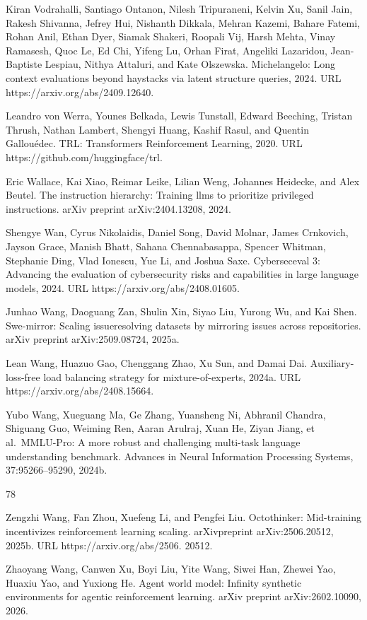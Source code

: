 \documentclass[
  10
]{article}
\begin{document}
Kiran Vodrahalli, Santiago Ontanon, Nilesh Tripuraneni, Kelvin Xu, Sanil
Jain, Rakesh Shivanna, Jefrey Hui, Nishanth Dikkala, Mehran Kazemi,
Bahare Fatemi, Rohan Anil, Ethan Dyer, Siamak Shakeri, Roopali Vij,
Harsh Mehta, Vinay Ramasesh, Quoc Le, Ed Chi, Yifeng Lu, Orhan Firat,
Angeliki Lazaridou, Jean-Baptiste Lespiau, Nithya Attaluri, and Kate
Olszewska. Michelangelo: Long context evaluations beyond haystacks via
latent structure queries, 2024. URL https://arxiv.org/abs/2409.12640.

Leandro von Werra, Younes Belkada, Lewis Tunstall, Edward Beeching,
Tristan Thrush, Nathan Lambert, Shengyi Huang, Kashif Rasul, and Quentin
Gallouédec. TRL: Transformers Reinforcement Learning, 2020. URL
https://github.com/huggingface/trl.

Eric Wallace, Kai Xiao, Reimar Leike, Lilian Weng, Johannes Heidecke,
and Alex Beutel. The instruction hierarchy: Training llms to prioritize
privileged instructions. arXiv preprint arXiv:2404.13208, 2024.

Shengye Wan, Cyrus Nikolaidis, Daniel Song, David Molnar, James
Crnkovich, Jayson Grace, Manish Bhatt, Sahana Chennabasappa, Spencer
Whitman, Stephanie Ding, Vlad Ionescu, Yue Li, and Joshua Saxe.
Cyberseceval 3: Advancing the evaluation of cybersecurity risks and
capabilities in large language models, 2024. URL
https://arxiv.org/abs/2408.01605.

Junhao Wang, Daoguang Zan, Shulin Xin, Siyao Liu, Yurong Wu, and Kai
Shen. Swe-mirror: Scaling issueresolving datasets by mirroring issues
across repositories. arXiv preprint arXiv:2509.08724, 2025a.

Lean Wang, Huazuo Gao, Chenggang Zhao, Xu Sun, and Damai Dai.
Auxiliary-loss-free load balancing strategy for mixture-of-experts,
2024a. URL https://arxiv.org/abs/2408.15664.

Yubo Wang, Xueguang Ma, Ge Zhang, Yuansheng Ni, Abhranil Chandra,
Shiguang Guo, Weiming Ren, Aaran Arulraj, Xuan He, Ziyan Jiang, et
al.~MMLU-Pro: A more robust and challenging multi-task language
understanding benchmark. Advances in Neural Information Processing
Systems, 37:95266--95290, 2024b.

78

Zengzhi Wang, Fan Zhou, Xuefeng Li, and Pengfei Liu. Octothinker:
Mid-training incentivizes reinforcement learning scaling. arXivpreprint
arXiv:2506.20512, 2025b. URL https://arxiv.org/abs/2506. 20512.

Zhaoyang Wang, Canwen Xu, Boyi Liu, Yite Wang, Siwei Han, Zhewei Yao,
Huaxiu Yao, and Yuxiong He. Agent world model: Infinity synthetic
environments for agentic reinforcement learning. arXiv preprint
arXiv:2602.10090, 2026.
\end{document}
